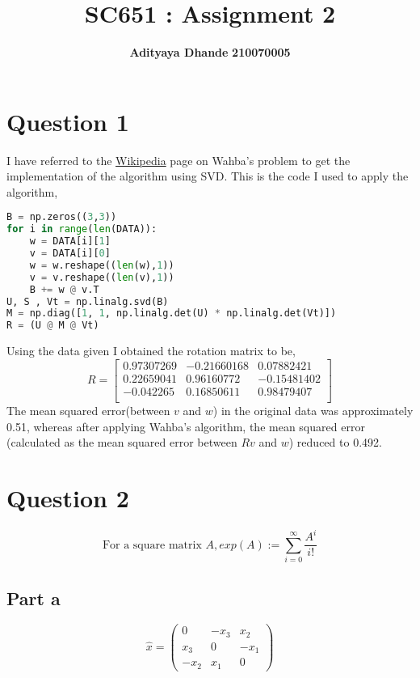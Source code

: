 \documentclass[11pt]{article}
\title{\textbf{SC651 : Assignment 2}}
\author{\textbf{Adityaya Dhande}   \hspace{8mm} \textbf{210070005}}
\date{}
\begin{document}
\maketitle
\section*{Question 1}
I have referred to the \href{https://en.wikipedia.org/wiki/Wahba%27s_problem}{Wikipedia} page on Wahba's problem to get the implementation of the algorithm using SVD. This is the code I used to apply the algorithm,
\begin{lstlisting}[language=python]
B = np.zeros((3,3))
for i in range(len(DATA)):
    w = DATA[i][1]
    v = DATA[i][0]
    w = w.reshape((len(w),1))
    v = v.reshape((len(v),1))
    B += w @ v.T
U, S , Vt = np.linalg.svd(B)
M = np.diag([1, 1, np.linalg.det(U) * np.linalg.det(Vt)])
R = (U @ M @ Vt)
\end{lstlisting}
Using the data given I obtained the rotation matrix to be, 
\begin{equation*}
    R = \begin{bmatrix}
        0.97307269 & -0.21660168 & 0.07882421 \\ 
        0.22659041 & 0.96160772 & -0.15481402 \\ 
        -0.042265 & 0.16850611 & 0.98479407 \\
    \end{bmatrix}
\end{equation*}
The mean squared error(between $v$ and $w$) in the original data was approximately 0.51, whereas after applying Wahba's algorithm, the mean squared error (calculated as the mean squared error between $Rv$ and $w$)
reduced to 0.492.
\section*{Question 2}
\begin{equation}
    \text{For a square matrix } A, exp(A) := \sum_{i = 0}^{\infty} \frac{A^i}{i!} 
\end{equation}
\subsection*{Part a}
$$
\hat{x} = \begin{pmatrix}
    0 & -x_3 & x_2 \\
    x_3 & 0 & -x_1 \\
    -x_2 & x_1 & 0
\end{pmatrix}
$$
\end{document}
